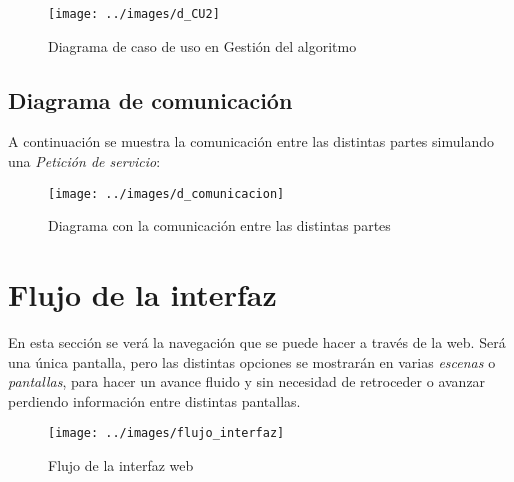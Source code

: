 \bigskip
\begin{figure}[h]
	\centering
	\texttt{[image: ../images/d\_CU2]}
	\caption[Diagrama de caso de uso en Gestión del algoritmo]{Diagrama de caso de uso en Gestión del algoritmo}
	\label{fig:d_CU2}
\end{figure}


\newpage
\subsection{Diagrama de comunicación}
\bigskip
A continuación se muestra la comunicación entre las distintas partes simulando una \textit{Petición de servicio}:


\bigskip
\begin{figure}[h]
	\centering
	\texttt{[image: ../images/d\_comunicacion]}
	\caption[Diagrama con la comunicación entre las distintas partes]{Diagrama con la comunicación entre las distintas partes}
	\label{fig:d_comunicacion}
\end{figure}



\newpage %
\section{Flujo de la interfaz}
\bigskip

En esta sección se verá la navegación que se puede hacer a través de la web. Será una única pantalla, pero las distintas opciones se mostrarán en varias \textit{escenas} o \textit{pantallas}, para hacer un avance fluido y sin necesidad de retroceder o avanzar perdiendo información entre distintas pantallas.

\bigskip
\begin{figure}[h]
	\centering
	\texttt{[image: ../images/flujo\_interfaz]}
	\caption[Flujo de la interfaz web]{Flujo de la interfaz web}
	\label{fig:flujo_interfaz}
\end{figure}

